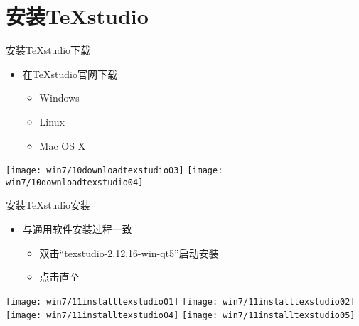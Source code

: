\documentclass[fontset = none, t]{ctexbeamer}
\begin{document}
\section[安装TeXstudio]{安装TeXstudio}
\begin{frame}{安装TeXstudio}{下载}
  \begin{spacing}{1.5}
    \begin{itemize}
    \item 在TeXstudio官网下载%
      \begin{itemize}
      \item \faWindows{}Windows
      \item \faLinux{}Linux
      \item \faApple{}Mac OS X
      \end{itemize}
    \end{itemize}
    \begin{center}
      \texttt{[image: win7/10downloadtexstudio03]}
      \texttt{[image: win7/10downloadtexstudio04]}
    \end{center}
  \end{spacing}
\end{frame}

\begin{frame}{安装TeXstudio}{安装}
  \begin{spacing}{1.5}
    \begin{itemize}
    \item 与通用软件安装过程一致%
      \begin{itemize}
      \item 双击\enquote{texstudio-2.12.16-win-qt5}启动安装
      \item 点击直至
      \end{itemize}
    \end{itemize}
    \begin{center}
      \texttt{[image: win7/11installtexstudio01]}
      \texttt{[image: win7/11installtexstudio02]}\\
      \texttt{[image: win7/11installtexstudio04]}
      \texttt{[image: win7/11installtexstudio05]}
    \end{center}
  \end{spacing}
\end{frame}
\end{document}
